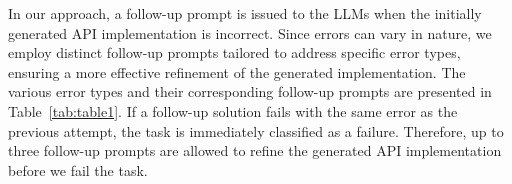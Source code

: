 In our approach, a follow-up prompt is issued to the LLMs when the initially generated API implementation is incorrect. Since errors can vary in nature, we employ distinct follow-up prompts tailored to address specific error types, ensuring a more effective refinement of the generated implementation. The various error types and their corresponding follow-up prompts are presented in Table~\ref{tab:table1}. If a follow-up solution fails with the same error as the previous attempt, the task is immediately classified as a failure. Therefore, up to three follow-up prompts are allowed to refine the generated API implementation before we fail the task.

